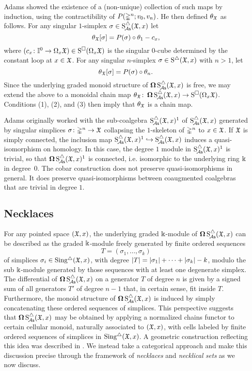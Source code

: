 Adams showed the existence of a (non-unique) collection of such maps by induction, using the contractibility of $P(\mathbb{\Delta}^n;v_0,v_n)$.
He then defined $\theta_{\mathfrak{X}}$ as follows.
For any singular $1$-simplex $\sigma \in \operatorname{S^{\triangle}_{\!{\mathcal{A}\mathsf{s}}}}(\mathfrak{X},x)$ let
\[
\theta_{\mathfrak{X}}[\sigma] = P(\sigma) \circ \theta_1 - c_x,
\]
where $(c_x \colon \mathbb{I}^0 \to \Omega_x \mathfrak{X}) \in \operatorname{S^{\square}}(\Omega_x \mathfrak{X})$ is the singular $0$-cube determined by the constant loop at $x \in \mathfrak{X}$.
For any singular $n$-simplex $\sigma \in \operatorname{S^{\triangle}}(\mathfrak{X},x)$ with $n>1$, let
\[
\theta_{\mathfrak{X}}[\sigma] = P(\sigma) \circ \theta_n.
\]
Since the underlying graded monoid structure of $\operatorname{\mathbf{\Omega}} \operatorname{S^{\triangle}_{\!{\mathcal{A}\mathsf{s}}}}(\mathfrak{X},x)$ is free, we may extend the above to a monoidal chain map $\theta_{\mathfrak{X}} \colon \operatorname{\mathbf{\Omega}} \operatorname{S^{\triangle}_{\!{\mathcal{A}\mathsf{s}}}}(\mathfrak{X},x) \to \operatorname{S^{\square}}(\Omega_x \mathfrak{X})$.
Conditions (1), (2), and (3) then imply that $\theta_{\mathfrak{X}}$ is a chain map.

\begin{remark}
	Adams originally worked with the sub-coalgebra $\operatorname{S^{\triangle}_{\!{\mathcal{A}\mathsf{s}}}}(\mathfrak{X},x)^1$ of $\operatorname{S^{\triangle}_{\!{\mathcal{A}\mathsf{s}}}}(\mathfrak{X},x)$ generated by singular simplices $\sigma \colon \mathbb{\Delta}^n \to \mathfrak{X}$ collapsing the $1$-skeleton of $\mathbb{\Delta}^n$ to $x \in \mathfrak{X}$.
	If $\mathfrak{X}$ is simply connected, the inclusion map $\operatorname{S^{\triangle}_{\!{\mathcal{A}\mathsf{s}}}}(\mathfrak{X},x)^1 \hookrightarrow \operatorname{S^{\triangle}_{\!{\mathcal{A}\mathsf{s}}}}(\mathfrak{X},x)$ induces a quasi-isomorphism on homology.
	In this case, the degree $1$ module in $\operatorname{S^{\triangle}_{\!{\mathcal{A}\mathsf{s}}}}(\mathfrak{X},x)^1$ is trivial, so that $\operatorname{\mathbf{\Omega}} \operatorname{S^{\triangle}_{\!{\mathcal{A}\mathsf{s}}}}(\mathfrak{X},x)^1$ is connected, i.e.
	isomorphic to the underlying ring $\Bbbk$ in degree~$0$.
	The cobar construction does not preserve quasi-isomorphisms in general.
	It does preserve quasi-isomorphisms between coaugmented coalgebras that are trivial in degree $1$.
\end{remark}

\subsection{Necklaces}

For any pointed space $(\mathfrak{X},x)$, the underlying graded $\Bbbk$-module of $\operatorname{\mathbf{\Omega}} \operatorname{S^{\triangle}_{\!{\mathcal{A}\mathsf{s}}}}(\mathfrak{X},x)$ can be described as the graded $\Bbbk$-module freely generated by finite ordered sequences
\[
T = (\sigma_1, \dots, \sigma_k)
\]
of simplices $\sigma_i \in \operatorname{Sing^{\triangle}}(\mathfrak{X},x)$, with degree $\lvert T\rvert = \lvert\sigma_1\rvert+\dots+\lvert\sigma_k\rvert - k$, modulo the sub $\Bbbk$-module generated by those sequences with at least one degenerate simplex.
The differential of $\operatorname{\mathbf{\Omega}} \operatorname{S^{\triangle}_{\!{\mathcal{A}\mathsf{s}}}}(\mathfrak{X},x)$ on a generator $T$ of degree $n$ is given by a signed sum of all generators $T'$ of degree $n-1$ that, in certain sense, fit inside $T$.
Furthermore, the monoid structure of $\operatorname{\mathbf{\Omega}} \operatorname{S^{\triangle}_{\!{\mathcal{A}\mathsf{s}}}}(\mathfrak{X},x)$ is induced by simply concatenating these ordered sequences of simplices.
This perspective suggests that $\operatorname{\mathbf{\Omega}} \operatorname{S^{\triangle}_{\!{\mathcal{A}\mathsf{s}}}}(\mathfrak{X},x)$ may be obtained by applying a normalized chains functor to certain cellular monoid, naturally associated to $(\mathfrak{X},x)$, with cells labeled by finite ordered sequences of simplices in $\operatorname{Sing^{\triangle}}(\mathfrak{X},x)$.
A geometric construction reflecting this idea was described in \cite{baues1980geometry}.
We instead take a categorical approach and make this discussion precise through the framework of \textit{necklaces} and \textit{necklical sets} as we now discuss.

